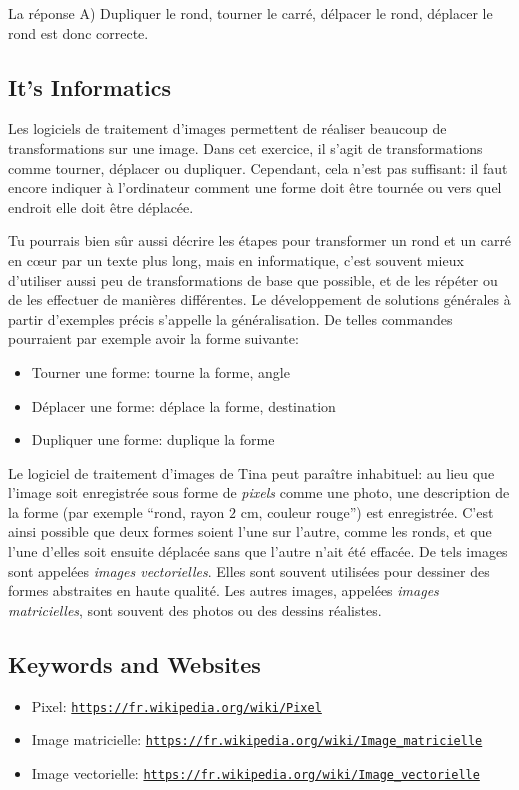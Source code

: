 \documentclass[a4paper,11pt]{report}
\newcommand{\BrochureUrlText}[1]{\texttt{#1}}
\begin{document}
La réponse A) Dupliquer le rond, tourner le carré, délpacer le rond, déplacer le rond est donc correcte.


\subsection*{It’s Informatics}

Les logiciels de traitement d’images permettent de réaliser beaucoup de transformations sur une image. Dans cet exercice, il s’agit de transformations comme tourner, déplacer ou dupliquer. Cependant, cela n’est pas suffisant: il faut encore indiquer à l’ordinateur comment une forme doit être tournée ou vers quel endroit elle doit être déplacée.

Tu pourrais bien sûr aussi décrire les étapes pour transformer un rond et un carré en cœur par un texte plus long, mais en informatique, c’est souvent mieux d’utiliser aussi peu de transformations de base que possible, et de les répéter ou de les effectuer de manières différentes. Le développement de solutions générales à partir d’exemples précis s’appelle la généralisation. De telles commandes pourraient par exemple avoir la forme suivante:

\begin{itemize}
  \item Tourner une forme: tourne la forme, angle
  \item Déplacer une forme: déplace la forme, destination
  \item Dupliquer une forme: duplique la forme
\end{itemize}

Le logiciel de traitement d’images de Tina peut paraître inhabituel: au lieu que l’image soit enregistrée sous forme de \emph{pixels} comme une photo, une description de la forme (par exemple “rond, rayon $2$ cm, couleur rouge”) est enregistrée. C’est ainsi possible que deux formes soient l’une sur l’autre, comme les ronds, et que l’une d’elles soit ensuite déplacée sans que l’autre n’ait été effacée. De tels images sont appelées \emph{images vectorielles}. Elles sont souvent utilisées pour dessiner des formes abstraites en haute qualité. Les autres images, appelées \emph{images matricielles}, sont souvent des photos ou des dessins réalistes.

{\raggedright

\subsection*{Keywords and Websites}

\begin{itemize}
  \item Pixel: \href{https://fr.wikipedia.org/wiki/Pixel}{\BrochureUrlText{https://fr.wikipedia.org/wiki/Pixel}}
  \item Image matricielle: \href{https://fr.wikipedia.org/wiki/Image_matricielle}{\BrochureUrlText{https://fr.wikipedia.org/wiki/Image\_matricielle}}
  \item Image vectorielle: \href{https://fr.wikipedia.org/wiki/Image_vectorielle}{\BrochureUrlText{https://fr.wikipedia.org/wiki/Image\_vectorielle}}
\end{itemize}


}
\end{document}
